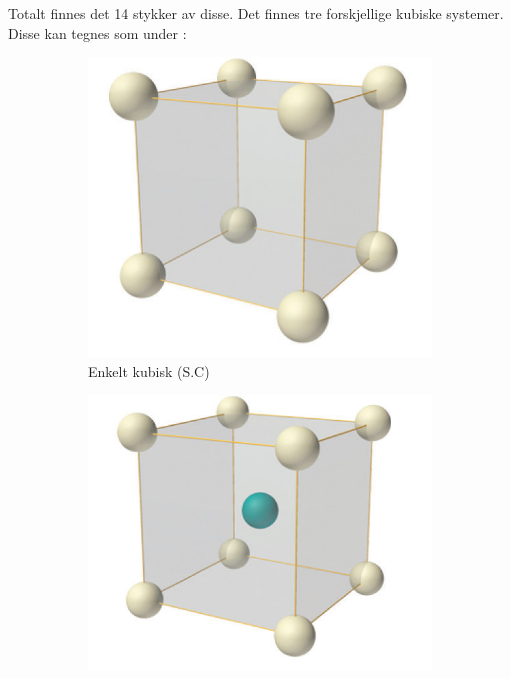 \documentclass{article}
\begin{document}
Totalt finnes det 14 stykker av disse.
Det finnes tre forskjellige kubiske systemer. Disse kan tegnes som under \cite{kubiske_systemer}:
\begin{figure}[H]
  \centering
  \begin{subfigure}{0.3\textwidth}
    \includegraphics[width=\linewidth]{bilder/enkelt_kubisk.png}
    \caption{Enkelt kubisk (S.C)}
    \label{fig:enkelt_kubisk}
  \end{subfigure}
  \begin{subfigure}{0.3\textwidth}
    \includegraphics[width=\linewidth]{bilder/romsentert_kubisk.png}

\end{subfigure}
\end{figure}
\end{document}
